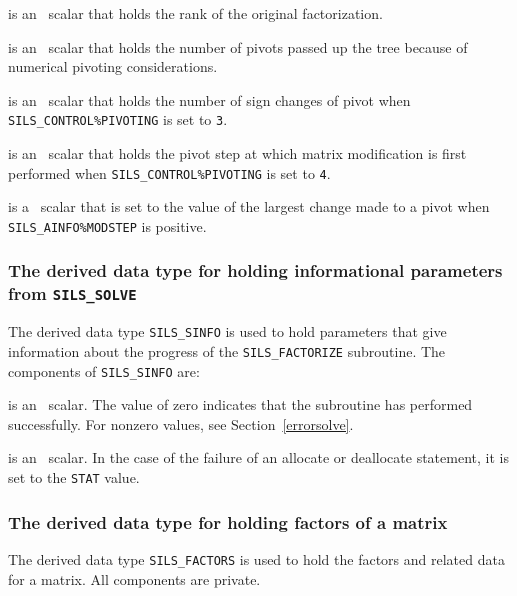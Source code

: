 \documentclass{galahad}
\newcommand{\packagename}{SILS}
\begin{document}
\begin{description}
 is an \integer\ scalar that holds 
 the rank of the original factorization. 
 
 is an \integer\ scalar that holds the number of pivots passed 
up the tree because of numerical pivoting considerations. 
 
 is an \integer\ scalar that holds the number of sign changes 
of pivot when {\tt \packagename\_CONTROL\%PIVOTING} is set to {\tt 3}. 
 
 is an \integer\ scalar that holds the pivot step at which  
matrix modification is first performed when 
{\tt \packagename\_CO\-NTROL\%PIVOTING} is set to {\tt 4}. 
 
 is a \realdp\ scalar that is set to the value of the largest 
change made to a pivot when {\tt \packagename\_AINFO\%MODSTEP} is positive. 
 
\end{description}


\subsubsection{The derived data type for holding informational
 parameters from {\tt \packagename\_SOLVE}}\label{typeinfos}
The derived data type 
{\tt \packagename\_SINFO} 
is used to hold parameters that give information about the progress of the
{\tt \packagename\_FA\-CTORIZE} subroutine. The components of
{\tt \packagename\_SINFO} 
are:

\begin{description}

 is an \integer\ scalar. The value 
 of zero indicates that the subroutine has performed 
 successfully.  For nonzero values, see Section~\ref{errorsolve}.
 
 
 is an \integer\ scalar. In the case of the failure of an 
allocate or deallocate statement, it is set to the {\tt STAT} value. 
 
\end{description}


\subsubsection{The derived data type for holding factors of a matrix}
\label{typefactors}
The derived data type 
{\tt \packagename\_FACTORS} 
is used to hold the factors and related data for a matrix.
All components are private.
\end{document}
